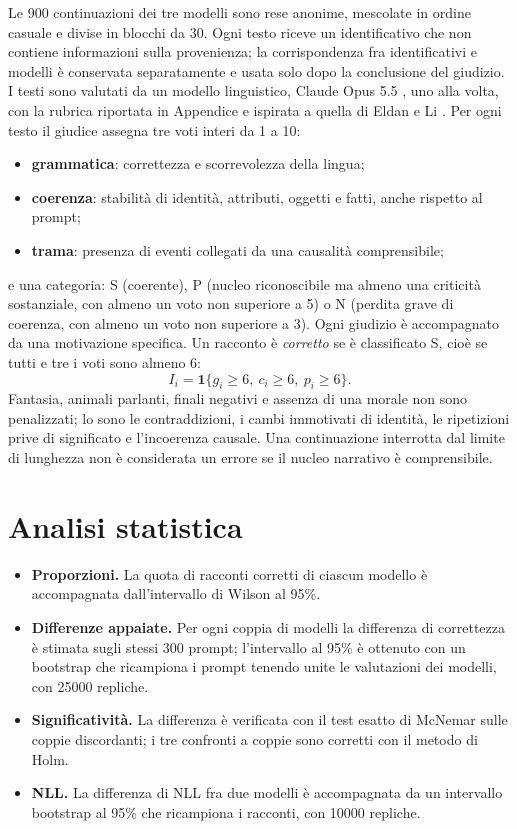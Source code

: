 Le 900 continuazioni dei tre modelli sono rese anonime, mescolate in ordine casuale e divise in blocchi da 30. Ogni testo riceve un identificativo che non contiene informazioni sulla provenienza; la corrispondenza fra identificativi e modelli è conservata separatamente e usata solo dopo la conclusione del giudizio. I testi sono valutati da un modello linguistico, Claude Opus 5.5 \cite{anthropic2026claude}, uno alla volta, con la rubrica riportata in Appendice e ispirata a quella di Eldan e Li \cite{eldan2023tinystories}. Per ogni testo il giudice assegna tre voti interi da 1 a 10:
\begin{itemize}
\item \textbf{grammatica}: correttezza e scorrevolezza della lingua;
\item \textbf{coerenza}: stabilità di identità, attributi, oggetti e fatti, anche rispetto al prompt;
\item \textbf{trama}: presenza di eventi collegati da una causalità comprensibile;
\end{itemize}
e una categoria: S (coerente), P (nucleo riconoscibile ma almeno una criticità sostanziale, con almeno un voto non superiore a 5) o N (perdita grave di coerenza, con almeno un voto non superiore a 3). Ogni giudizio è accompagnato da una motivazione specifica. Un racconto è \emph{corretto} se è classificato S, cioè se tutti e tre i voti sono almeno 6:
\begin{equation}
I_i=\mathbf 1\{g_i\geq6,\ c_i\geq6,\ p_i\geq6\}.
\label{eq:regola-correttezza}
\end{equation}
Fantasia, animali parlanti, finali negativi e assenza di una morale non sono penalizzati; lo sono le contraddizioni, i cambi immotivati di identità, le ripetizioni prive di significato e l'incoerenza causale. Una continuazione interrotta dal limite di lunghezza non è considerata un errore se il nucleo narrativo è comprensibile.

\section{Analisi statistica}
\label{sec:metodo-statistica}

\begin{itemize}
\item \textbf{Proporzioni.} La quota di racconti corretti di ciascun modello è accompagnata dall'intervallo di Wilson al 95\%.
\item \textbf{Differenze appaiate.} Per ogni coppia di modelli la differenza di correttezza è stimata sugli stessi 300 prompt; l'intervallo al 95\% è ottenuto con un bootstrap che ricampiona i prompt tenendo unite le valutazioni dei modelli, con \num{25000} repliche.
\item \textbf{Significatività.} La differenza è verificata con il test esatto di McNemar sulle coppie discordanti; i tre confronti a coppie sono corretti con il metodo di Holm.
\item \textbf{NLL.} La differenza di NLL fra due modelli è accompagnata da un intervallo bootstrap al 95\% che ricampiona i racconti, con \num{10000} repliche.
\end{itemize}

